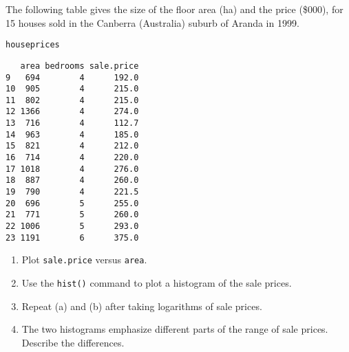 \documentclass{article}\usepackage[]{graphicx}\usepackage[]{color}
\makeatletter
\newcommand{\hlstd}[1]{\textcolor[rgb]{0.345,0.345,0.345}{#1}}%
\newenvironment{kframe}{%
 \def\at@end@of@kframe{}%
 \ifinner\ifhmode%
  \def\at@end@of@kframe{\end{minipage}}%
  \begin{minipage}{\columnwidth}%
 \fi\fi%
 \def\FrameCommand##1{\hskip\@totalleftmargin \hskip-\fboxsep
 \colorbox{shadecolor}{##1}\hskip-\fboxsep
     \hskip-\linewidth \hskip-\@totalleftmargin \hskip\columnwidth}%
 \MakeFramed {\advance\hsize-\width
   \@totalleftmargin\z@ \linewidth\hsize
   \@setminipage}}%
 {\par\unskip\endMakeFramed%
 \at@end@of@kframe}
\newenvironment{knitrout}{}{} %
\makeatother
\begin{document}
The following table gives the size of the floor area (ha) and
  the price (\$000), for 15 houses sold in the Canberra (Australia)
  suburb of Aranda in 1999.


\begin{knitrout}
\color{fgcolor}\begin{kframe}
\begin{alltt}
\hlstd{houseprices}
\end{alltt}
\begin{verbatim}
   area bedrooms sale.price
9   694        4      192.0
10  905        4      215.0
11  802        4      215.0
12 1366        4      274.0
13  716        4      112.7
14  963        4      185.0
15  821        4      212.0
16  714        4      220.0
17 1018        4      276.0
18  887        4      260.0
19  790        4      221.5
20  696        5      255.0
21  771        5      260.0
22 1006        5      293.0
23 1191        6      375.0
\end{verbatim}
\end{kframe}
\end{knitrout}

\begin{enumerate}
\item Plot \verb+sale.price+ versus \verb+area+.
\item Use the \verb+hist()+ command to plot a histogram of the sale prices.
\item Repeat (a) and (b) after taking logarithms of sale prices.
\item The two histograms emphasize different parts of the range of sale prices. Describe the differences.
\end{enumerate}
\end{document}
